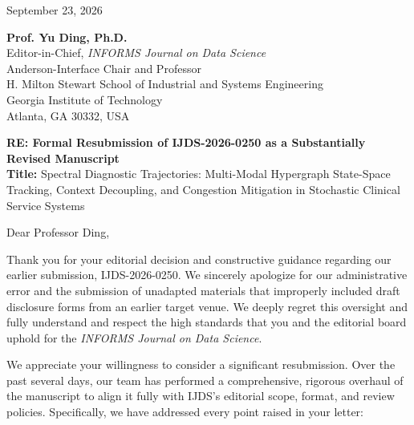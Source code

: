 \documentclass[11pt,letterpaper]{article}
\begin{document}
\begin{flushright}
    September 23, 2026
\end{flushright}

\textbf{Prof. Yu Ding, Ph.D.}\\
Editor-in-Chief, \textit{INFORMS Journal on Data Science}\\
Anderson-Interface Chair and Professor\\
H. Milton Stewart School of Industrial and Systems Engineering\\
Georgia Institute of Technology\\
Atlanta, GA 30332, USA

\vspace{10pt}

\textbf{RE: Formal Resubmission of IJDS-2026-0250 as a Substantially Revised Manuscript}\\
\textbf{Title:} Spectral Diagnostic Trajectories: Multi-Modal Hypergraph State-Space Tracking, Context Decoupling, and Congestion Mitigation in Stochastic Clinical Service Systems

\vspace{8pt}

Dear Professor Ding,

Thank you for your editorial decision and constructive guidance regarding our earlier submission, IJDS-2026-0250. We sincerely apologize for our administrative error and the submission of unadapted materials that improperly included draft disclosure forms from an earlier target venue. We deeply regret this oversight and fully understand and respect the high standards that you and the editorial board uphold for the \textit{INFORMS Journal on Data Science}.

We appreciate your willingness to consider a significant resubmission. Over the past several days, our team has performed a comprehensive, rigorous overhaul of the manuscript to align it fully with IJDS's editorial scope, format, and review policies. Specifically, we have addressed every point raised in your letter:
\end{document}
